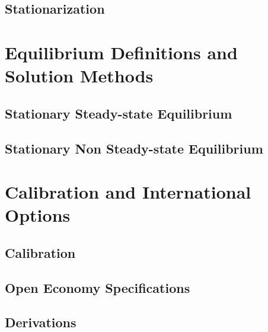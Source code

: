 \documentclass[letterpaper,12pt]{book}
\theoremstyle{definition}
\numberwithin{equation}{chapter}
\begin{document}
  \chapter{Stationarization}\label{Chap_Stnrz}
    

\part{Equilibrium Definitions and Solution Methods}\label{PartEqlbm}
  \chapter{Stationary Steady-state Equilibrium}\label{Chap_SSeqlb}
    
  \chapter{Stationary Non Steady-state Equilibrium}\label{Chap_NSSeqlb}
    

\part{Calibration and International Options}\label{PartSolMthCal}
  \chapter{Calibration}\label{Chap_Calibr}
  \chapter{Open Economy Specifications}\label{Chap_SmOpEcn}
    


\appendix
\appendixpage
\addappheadtotoc

\chapter{Derivations}\label{Chap_Deriv}
  
%   
%   
%   



\end{document}
